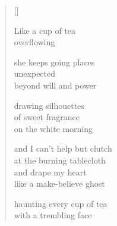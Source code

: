 \documentclass[12pt,a4paper]{article}
\begin{document}
\thispagestyle{empty}

\poemtitle{}

\settowidth{\versewidth}{Like a make-believe ghost}

\bigskip

\begin{verse}[\versewidth]

Like a cup of tea \\
overflowing

she keeps going places \\
unexpected \\
beyond will and power

drawing silhouettes \\
of sweet fragrance \\
on the white morning

and I can't help but clutch \\
at the burning tablecloth \\
and drape my heart \\
like a make-believe ghost

haunting every cup of tea \\
with a trembling face
\end{verse}
\end{document}
